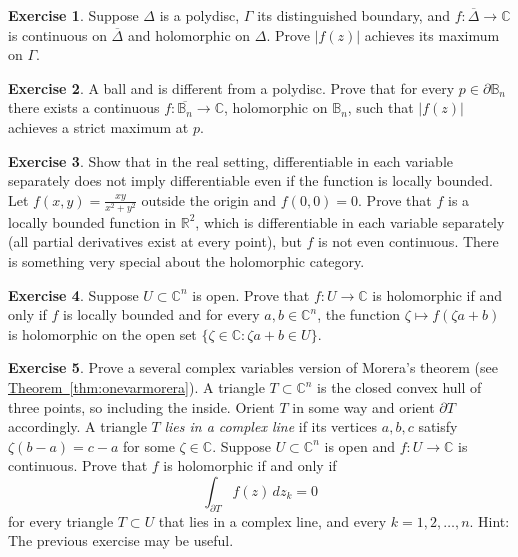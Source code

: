 \documentclass[12pt,openany]{book}
\newcommand{\sabs}[1]{\lvert {#1} \rvert}
\newcommand{\C}{{\mathbb{C}}}
\newcommand{\R}{{\mathbb{R}}}
\newcommand{\bB}{{\mathbb{B}}}
\theoremstyle{plain}
\theoremstyle{remark}
\theoremstyle{definition}
\newenvironment{exbox}{%
    \def\FrameCommand{\vrule width 1pt \relax\hspace{10pt}}%
    \MakeFramed{\advance\hsize-\width\FrameRestore}%
}{%
    \endMakeFramed
}
\theoremstyle{exercise}
\newtheorem{exercise}{Exercise}[section]
\theoremstyle{example}
\newcommand{\thmref}[1]{\hyperref[#1]{Theorem~\ref*{#1}}}
\begin{document}
\begin{exbox}
\begin{exercise}
Suppose $\Delta$ is a polydisc, $\Gamma$ its distinguished boundary,
and $f \colon \overline{\Delta} \to \C$ is continuous on $\overline{\Delta}$
and holomorphic on $\Delta$.
Prove
$\sabs{f(z)}$ achieves its maximum on $\Gamma$.
\end{exercise}

\begin{exercise}
A ball and is different from a polydisc.  Prove that for every $p \in \partial \bB_n$
there exists a continuous $f \colon \overline{\bB_n} \to \C$, holomorphic
on $\bB_n$, such that $\sabs{f(z)}$ achieves a strict maximum at $p$.
\end{exercise}

\begin{exercise}
Show that in the real setting, differentiable
in each variable separately does not imply differentiable even if
the function is locally bounded.
Let $f(x,y) = \frac{xy}{x^2+y^2}$ outside the origin
and $f(0,0) = 0$.  Prove that $f$ is a
locally bounded function in $\R^2$, which is differentiable
in each variable separately (all partial derivatives exist at every point),
but $f$ is not even continuous.  There is something very
special about the holomorphic category.
\end{exercise}

\begin{exercise}
Suppose $U \subset \C^n$ is open.
Prove that $f \colon U \to \C$ is holomorphic if and only if
$f$ is locally bounded and
for every $a,b \in \C^n$, the
function
$\zeta \mapsto f(\zeta a + b)$ is holomorphic on
the open set $\{ \zeta \in \C : \zeta a + b \in U \}$.
\end{exercise}

\begin{exercise}
Prove a several complex variables version of Morera's theorem (see
\thmref{thm:onevarmorera}).
A triangle $T \subset \C^n$ is the closed convex hull of three points, so
including the inside.  Orient $T$ in some way %
and orient $\partial T$ accordingly.
A triangle $T$ \emph{lies in a complex line} if
its vertices $a,b,c$ satisfy
$\zeta (b-a) = c-a$ for some $\zeta \in \C$.
Suppose $U \subset \C^n$ is open and $f \colon U \to \C$ is continuous.
Prove that $f$ is holomorphic if and only if
\begin{equation*}
\int_{\partial T} f(z) \, dz_k = 0
\end{equation*}
for every triangle $T \subset U$ that lies in a complex line,
and every $k=1,2,\ldots,n$.
Hint: The previous exercise may be useful.
\end{exercise}


\end{exbox}
\end{document}
